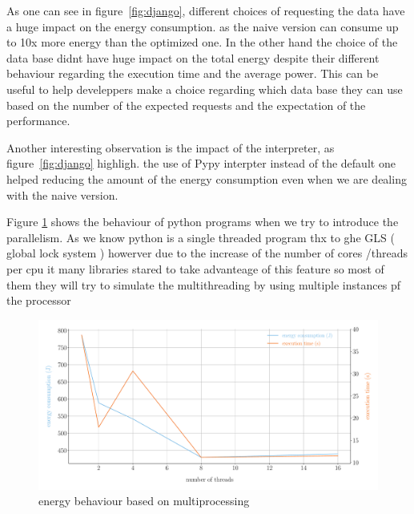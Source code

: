 
As one can see in figure~\ref{fig:django}, different choices of requesting the data have a huge impact on the energy consumption. as the naive version can consume up to 10x more energy than the optimized one.
In the other hand the choice of the data base didnt have huge impact on the total energy despite their different behaviour regarding the execution time and the average power.
This can be useful to help develeppers make a choice regarding which data base they can use based on the number of the expected requests and the expectation of the performance.

Another interesting observation is the impact of the interpreter, as figure~\ref{fig:django} highligh. the use of Pypy interpter instead of the default one helped reducing the amount of the energy consumption even when we are dealing with the naive version.

Figure \ref{fig:python_multiprocessing} shows the behaviour of python programs when we try to introduce the parallelism.
As we know python is a single threaded program thx to ghe GLS ( global lock system ) howerver due to the increase of the number of cores /threads per cpu it many libraries stared to take advanteage of this feature so most of them they will try to simulate the multithreading by using multiple instances pf the processor %

\begin{figure}[hbt]
    \centering
    \includegraphics[width=\linewidth]{imgs/multiprocessing_energyvstime}
    \caption{energy behaviour based on multiprocessing}
    \label{fig:python_multiprocessing}
\end{figure}

